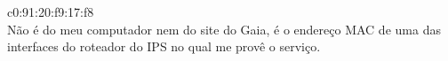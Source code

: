 
\begin{solution}
    c0:91:20:f9:17:f8 \\
    Não é do meu computador nem do site do Gaia, é o endereço MAC de uma das interfaces do roteador do IPS no qual me provê o serviço.
\end{solution}